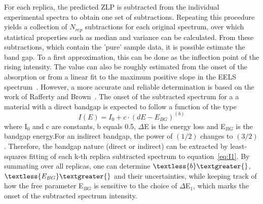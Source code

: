 %
For each replica, the predicted ZLP is subtracted from the individual 
experimental spectra to obtain one set of subtractions. 
Repeating this procedure yields a collection of $N_{rep}$ subtractions 
for each original spectrum, over which statistical properties such as 
median and variance can be calculated.\newline
%
From these subtractions, which contain the 'pure' sample data, 
it is possible estimate the band gap. To a first approximation,
this can be done as the inflection point of the rising intensity.
%
The value can also be roughly estimated from the onset of the absorption 
or from a linear fit to the maximum positive slope in the 
EELS spectrum~\cite{Schamm:2003}. 
%
However, a more accurate and reliable determination is based on the work of 
Rafferty and Brown~\cite{Rafferty:2000}. The onset of the subtracted spectrum 
for a a material with a direct bandgap is expected to follow a function of the type
\begin{equation}\label{eq:I1}
    I(E) = I_0 + c\cdot(dE-E_{BG})^{(b)}
\end{equation}
where I$_0$ and c are constants, b equals 0.5, $\Delta$E is the energy loss and E$_{BG}$ 
is the bandgap energy.For an indirect bandgap, the power of $(1/2)$ changes to $(3/2)$. 
%
Therefore, the bandgap nature (direct or indirect) can be extracted by 
least-squares fitting of each k-th replica subtracted spectrum to equation~\ref{eq:I1}.
%
By summating over all replicas, one can determine $\textless{b}\textgreater{}$, 
$\textless{E_{BG}}\textgreater{}$ 
and their uncertainties, while keeping track of how the free parameter
E$_{BG}$ is sensitive to the choice of $\Delta$E$_1$, which marks the onset
of the subtracted spectrum intensity.
%


